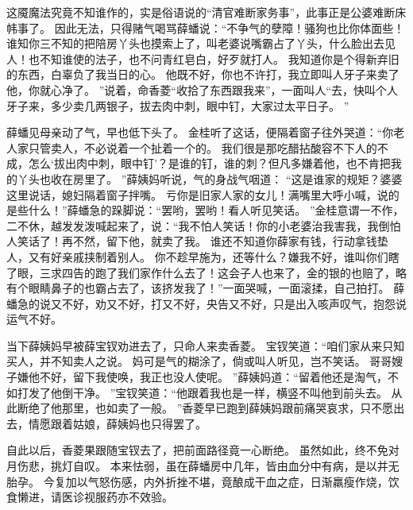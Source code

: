 这魇魔法究竟不知谁作的，实是俗语说的“清官难断家务事”，此事正是公婆难断床帏事了。
因此无法，只得赌气喝骂薛蟠说：“不争气的孽障！骚狗也比你体面些！谁知你三不知的把陪房丫头也摸索上了，叫老婆说嘴霸占了丫头，什么脸出去见人！也不知谁使的法子，也不问青红皂白，好歹就打人。
我知道你是个得新弃旧的东西，白辜负了我当日的心。
他既不好，你也不许打，我立即叫人牙子来卖了他，你就心净了。
”说着，命香菱“收拾了东西跟我来”，一面叫人“去，快叫个人牙子来，多少卖几两银子，拔去肉中刺，眼中钉，大家过太平日子。
”\par
薛蟠见母亲动了气，早也低下头了。
金桂听了这话，便隔着窗子往外哭道：“你老人家只管卖人，不必说着一个扯着一个的。
我们很是那吃醋拈酸容不下人的不成，怎么‘拔出肉中刺，眼中钉’？是谁的钉，谁的刺？但凡多嫌着他，也不肯把我的丫头也收在房里了。
”薛姨妈听说，气的身战气咽道：
“这是谁家的规矩？婆婆这里说话，媳妇隔着窗子拌嘴。
亏你是旧家人家的女儿！满嘴里大呼小喊，说的是些什么！”薛蟠急的跺脚说：“罢哟，罢哟！看人听见笑话。
”金桂意谓一不作，二不休，越发发泼喊起来了，说：“我不怕人笑话！你的小老婆治我害我，我倒怕人笑话了！再不然，留下他，就卖了我。
谁还不知道你薛家有钱，行动拿钱垫人，又有好亲戚挟制着别人。
你不趁早施为，还等什么？嫌我不好，谁叫你们瞎了眼，三求四告的跑了我们家作什么去了！这会子人也来了，金的银的也赔了，略有个眼睛鼻子的也霸占去了，该挤发我了！”一面哭喊，一面滚揉，自己拍打。
薛蟠急的说又不好，劝又不好，打又不好，央告又不好，只是出入咳声叹气，抱怨说运气不好。
\par
当下薛姨妈早被薛宝钗劝进去了，只命人来卖香菱。
宝钗笑道：“咱们家从来只知买人，并不知卖人之说。
妈可是气的糊涂了，倘或叫人听见，岂不笑话。
哥哥嫂子嫌他不好，留下我使唤，我正也没人使呢。
”薛姨妈道：“留着他还是淘气，不如打发了他倒干净。
”宝钗笑道：“他跟着我也是一样，横竖不叫他到前头去。
从此断绝了他那里，也如卖了一般。
”香菱早已跑到薛姨妈跟前痛哭哀求，只不愿出去，情愿跟着姑娘，薛姨妈也只得罢了。
\par
自此以后，香菱果跟随宝钗去了，把前面路径竟一心断绝。
虽然如此，终不免对月伤悲，挑灯自叹。
本来怯弱，虽在薛蟠房中几年，皆由血分中有病，是以并无胎孕。
今复加以气怒伤感，内外折挫不堪，竟酿成干血之症，日渐羸瘦作烧，饮食懒进，请医诊视服药亦不效验。
